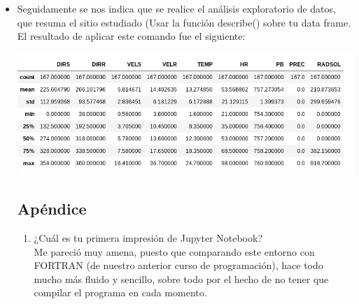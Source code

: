 \documentclass{article}
\begin{document}
\begin{doublespace}
\begin{itemize}
\item Seguidamente se nos indica que se realice el análisis exploratorio de datos, que resuma el sitio estudiado (Usar la función describe() sobre tu data frame. El resultado de aplicar este comando fue el siguiente:
\\
\begin{center}
\includegraphics[scale=0.5]{ultimatabla.png}
\end{center}

\subsection{Apéndice}
\begin{enumerate}
\item ¿Cuál es tu primera impresión de Jupyter Notebook?
\\
Me pareció muy amena, puesto que comparando este entorno con FORTRAN (de nuestro anterior curso de programación), hace todo mucho más fluido y sencillo, sobre todo por el hecho de no tener que compilar el programa en cada momento.


\end{enumerate}
\end{itemize}
\end{doublespace}
\end{document}
